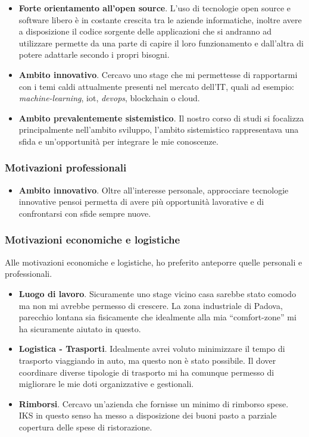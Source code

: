 \begin{itemize}
    \item \textbf{Forte orientamento all'open source}. L'uso di tecnologie open source e software libero è in costante crescita tra le aziende informatiche, inoltre avere a disposizione il codice sorgente delle applicazioni che si andranno ad utilizzare permette da una parte di capire il loro funzionamento e dall'altra di potere adattarle secondo i propri bisogni. 
    \item \textbf{Ambito innovativo}. Cercavo uno stage che mi permettesse di rapportarmi con i temi caldi attualmente presenti nel mercato dell'IT, quali ad esempio: \textit{\gls{machine-learning}}, \gls{iot}, \textit{devops}, \gls{blockchain} o \gls{cloud}.
    \item \textbf{Ambito prevalentemente sistemistico}. Il nostro corso di studi si focalizza principalmente nell'ambito sviluppo, l'ambito sistemistico rappresentava una sfida e un'opportunità per integrare le mie conoscenze.
\end{itemize}

\subsubsection{Motivazioni professionali}

\begin{itemize}
    \item \textbf{Ambito innovativo}. Oltre all'interesse personale, approcciare tecnologie innovative pensoi permetta di avere più opportunità lavorative e di confrontarsi con sfide sempre nuove. 
\end{itemize}

\subsubsection{Motivazioni economiche e logistiche}

Alle motivazioni economiche e logistiche, ho preferito anteporre quelle personali e professionali. 

\begin{itemize}
    \item \textbf{Luogo di lavoro}. Sicuramente uno stage vicino casa sarebbe stato comodo ma non mi avrebbe permesso di crescere. La zona industriale di Padova, parecchio lontana sia fisicamente che idealmente alla mia ``comfort-zone'' mi ha sicuramente aiutato in questo.
    \item \textbf{Logistica - Trasporti}. Idealmente avrei voluto minimizzare il tempo di trasporto viaggiando in auto, ma questo non è stato possibile. Il dover coordinare diverse tipologie di trasporto mi ha comunque permesso di migliorare le mie doti organizzative e gestionali. 
    \item \textbf{Rimborsi}. Cercavo un'azienda che fornisse un minimo di rimborso spese. IKS in questo senso ha messo a disposizione dei buoni pasto a parziale copertura delle spese di ristorazione.
\end{itemize}

